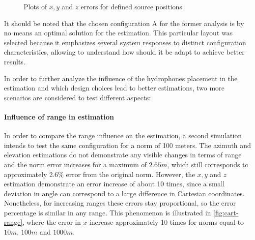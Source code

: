 \begin{figure}[!htbp]
	\captionsetup{justification=centering,margin=2cm}
	\caption{Plots of $x, y$ and $z$ errors for defined source positions}
	\label{fig:s1-A-n10-cart}
\end{figure}

It should be noted that the chosen configuration A for the former analysis is by no means an optimal solution for the estimation. This particular layout was selected because it emphasizes several system responses to distinct configuration characteristics, allowing to understand how should it be adapt to achieve better results.

In order to further analyze the influence of the hydrophones placement in the estimation and which design choices lead to better estimations, two more scenarios are considered to test different aspects:

\paragraph{Influence of range in estimation} In order to compare the range influence on the estimation, a second simulation intends to test the same configuration for a norm of 100 meters. The azimuth and elevation estimations do not demonstrate any visible changes in terms of range and the norm error increases for a maximum of $2.65m$, which still corresponds to approximately 2.6\% error from the original norm. However, the $x, y$ and $z$ estimation demonstrate an error increase of about 10 times, since a small deviation in angle can correspond to a large difference in Cartesian coordinates. Nonetheless, for increasing ranges these errors stay proportional, so the error percentage is similar in any range. This phenomenon is illustrated in \ref{fig:cart-range}, where the error in $x$ increase approximately 10 times for norms equal to $10 m$, $100 m$ and $1000 m$.


